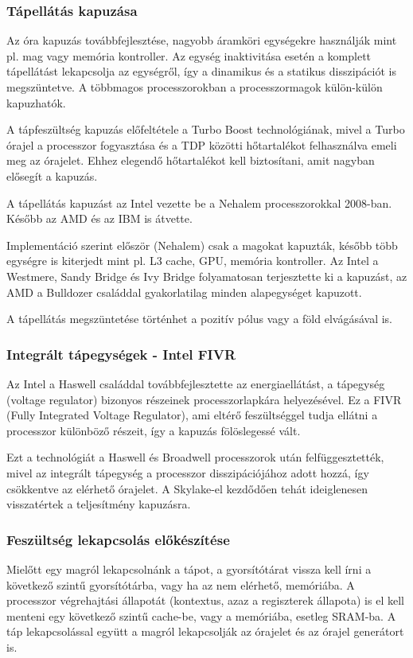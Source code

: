 \subsubsection{Tápellátás kapuzása}
Az óra kapuzás továbbfejlesztése, nagyobb áramköri egységekre használják mint pl. mag vagy memória kontroller.
Az egység inaktivitása esetén a komplett tápellátást lekapcsolja az egységről, így a dinamikus és a statikus disszipációt is megszüntetve.
A többmagos processzorokban a processzormagok külön-külön kapuzhatók.

A tápfeszültség kapuzás előfeltétele a Turbo Boost technológiának, mivel a Turbo órajel a processzor fogyasztása és a TDP közötti hőtartalékot felhasználva emeli meg az órajelet.
Ehhez elegendő hőtartalékot kell biztosítani, amit nagyban elősegít a kapuzás.

A tápellátás kapuzást az Intel vezette be a Nehalem processzorokkal 2008-ban.
Később az AMD és az IBM is átvette.

Implementáció szerint először (Nehalem) csak a magokat kapuzták, később több egységre is kiterjedt mint pl. L3 cache, GPU, memória kontroller.
Az Intel a Westmere, Sandy Bridge és Ivy Bridge folyamatosan terjesztette ki a kapuzást, az AMD a Bulldozer családdal gyakorlatilag minden alapegységet kapuzott.

A tápellátás megszüntetése történhet a pozitív pólus vagy a föld elvágásával is.

\subsubsection{Integrált tápegységek - Intel FIVR}
Az Intel a Haswell családdal továbbfejlesztette az energiaellátást, a tápegység (voltage regulator) bizonyos részeinek processzorlapkára helyezésével.
Ez a FIVR (Fully Integrated Voltage Regulator), ami eltérő feszültséggel tudja ellátni a processzor különböző részeit, így a kapuzás fölöslegessé vált.

Ezt a technológiát a Haswell és Broadwell processzorok után felfüggesztették, mivel az integrált tápegység a processzor disszipációjához adott hozzá, így csökkentve az elérhető órajelet.
A Skylake-el kezdődően tehát ideiglenesen visszatértek a teljesítmény kapuzásra.

\subsubsection{Feszültség lekapcsolás előkészítése}
Mielőtt egy magról lekapcsolnánk a tápot, a gyorsítótárat vissza kell írni a következő szintű gyorsítótárba, vagy ha az nem elérhető, memóriába.
A processzor végrehajtási állapotát (kontextus, azaz a regiszterek állapota) is el kell menteni egy következő szintű cache-be, vagy a memóriába, esetleg SRAM-ba.
A táp lekapcsolással együtt a magról lekapcsolják az órajelet és az órajel generátort is.

